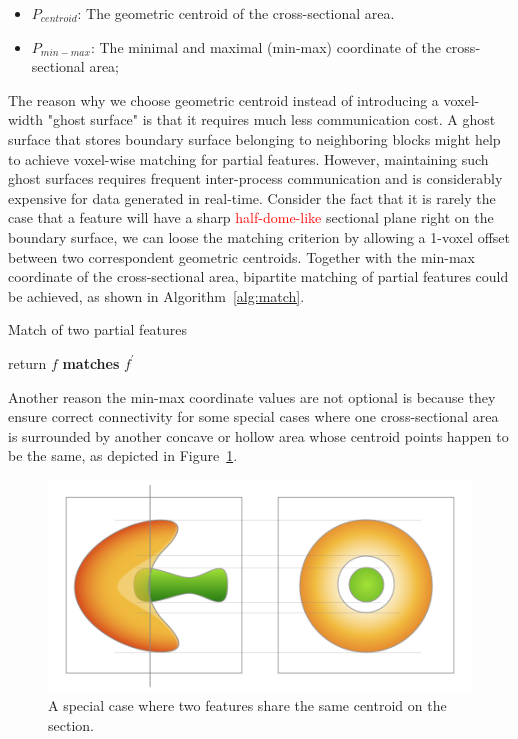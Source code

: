 \documentclass[10pt, conference, compsocconf]{IEEEtran}
\begin{document}
\begin{itemize}
	\item $P_{centroid}$: The geometric centroid of the cross-sectional area.
	\item $P_{min-max}$: The minimal and maximal (min-max) coordinate of the cross-sectional area;
\end{itemize}

The reason why we choose geometric centroid instead of introducing a voxel-width "ghost surface" is that it requires much less communication cost. A ghost surface that stores boundary surface belonging to neighboring blocks might help to achieve voxel-wise matching for partial features. However, maintaining such ghost surfaces requires frequent inter-process communication and is considerably expensive for data generated in real-time. Consider the fact that it is rarely the case that a feature will have a sharp \textcolor{red}{half-dome-like} sectional plane right on the boundary surface, we can loose the matching criterion by allowing a 1-voxel offset between two correspondent geometric centroids. Together with the min-max coordinate of the cross-sectional area, bipartite matching of partial features could be achieved, as shown in Algorithm~\ref{alg:match}.

\begin{algorithm}
\caption{Match of two partial features}
	\begin{algorithmic}
			\STATE return $f$ \textbf{matches} $f^{'}$
		\ENDIF
	\end{algorithmic}
\label{alg:match}
\end{algorithm}

Another reason the min-max coordinate values are not optional is because they ensure correct connectivity for some special cases where one cross-sectional area is surrounded by another concave or hollow area whose centroid points happen to be the same, as depicted in Figure~\ref{fig:special}.

\begin{figure}[ht]
	\centering
	\includegraphics[width=0.9\linewidth]{figure1@2x.png}
	\caption{A special case where two features share the same centroid on the section.}
	\label{fig:special}
\end{figure}
\end{document}
